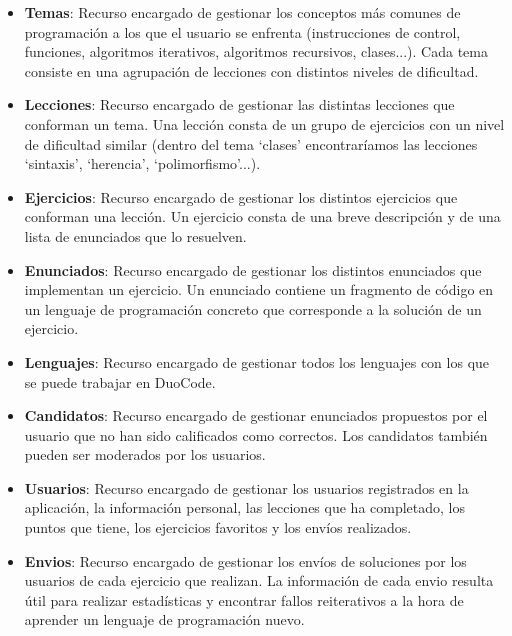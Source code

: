 \begin{itemize}

\item \textbf{Temas}: 
Recurso encargado de gestionar los conceptos más comunes de programación a los que el usuario se enfrenta (instrucciones de control, funciones, algoritmos iterativos, algoritmos recursivos, clases...). Cada tema consiste en una agrupación de lecciones con distintos niveles de dificultad.

\item \textbf{Lecciones}:
Recurso encargado de gestionar las distintas lecciones que conforman un tema. Una lección consta de un grupo de ejercicios con un nivel de dificultad similar (dentro del tema `clases' encontraríamos las lecciones `sintaxis', `herencia', `polimorfismo'...).

\item \textbf{Ejercicios}:
Recurso encargado de gestionar los distintos ejercicios que conforman una lección. Un ejercicio consta de una breve descripción y de una lista de enunciados que lo resuelven.

\item \textbf{Enunciados}:
Recurso encargado de gestionar los distintos enunciados que implementan un ejercicio. Un enunciado contiene un fragmento de código en un lenguaje de programación concreto que corresponde a la solución de un ejercicio.

\item \textbf{Lenguajes}:
Recurso encargado de gestionar todos los lenguajes con los que se puede trabajar en DuoCode.

\item \textbf{Candidatos}:
Recurso encargado de gestionar enunciados propuestos por el usuario que no han sido calificados como correctos. Los candidatos también pueden ser moderados por los usuarios.

\item \textbf{Usuarios}:
Recurso encargado de gestionar los usuarios registrados en la aplicación, la información personal, las lecciones que ha completado, los puntos que tiene, los ejercicios favoritos y los envíos realizados.

\item \textbf{Envios}:
Recurso encargado de gestionar los envíos de soluciones por los usuarios de cada ejercicio que realizan. La información de cada envio resulta útil para realizar estadísticas y encontrar fallos reiterativos a la hora de aprender un lenguaje de programación nuevo.

\end{itemize}

